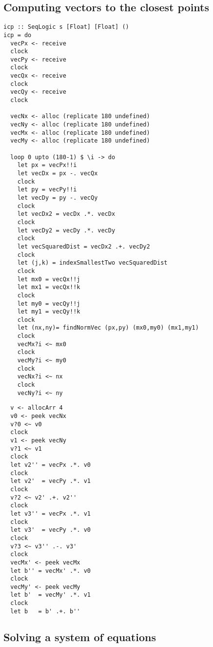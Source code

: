 \documentclass[preprint]{sigplanconf}
\def\codesmall{\sffamily\small}
\begin{document}
\subsection{Computing vectors to the closest points}

\lstset{basicstyle=\codesmall}

\begin{lstlisting}
icp :: SeqLogic s [Float] [Float] ()
icp = do
  vecPx <- receive
  clock
  vecPy <- receive
  clock
  vecQx <- receive
  clock
  vecQy <- receive
  clock

  vecNx <- alloc (replicate 180 undefined)
  vecNy <- alloc (replicate 180 undefined)
  vecMx <- alloc (replicate 180 undefined)
  vecMy <- alloc (replicate 180 undefined)

  loop 0 upto (180-1) $ \i -> do
    let px = vecPx!!i
    let vecDx = px -. vecQx
    clock
    let py = vecPy!!i
    let vecDy = py -. vecQy
    clock
    let vecDx2 = vecDx .*. vecDx
    clock
    let vecDy2 = vecDy .*. vecDy
    clock
    let vecSquaredDist = vecDx2 .+. vecDy2
    clock
    let (j,k) = indexSmallestTwo vecSquaredDist
    clock
    let mx0 = vecQx!!j
    let mx1 = vecQx!!k
    clock
    let my0 = vecQy!!j
    let my1 = vecQy!!k
    clock
    let (nx,ny)= findNormVec (px,py) (mx0,my0) (mx1,my1)
    clock
    vecMx?i <~ mx0
    clock
    vecMy?i <~ my0
    clock
    vecNx?i <~ nx
    clock
    vecNy?i <~ ny
\end{lstlisting}

\begin{lstlisting}
  v <- allocArr 4
  v0 <- peek vecNx
  v?0 <~ v0
  clock
  v1 <- peek vecNy
  v?1 <~ v1
  clock
  let v2'' = vecPx .*. v0
  clock
  let v2'  = vecPy .*. v1
  clock
  v?2 <~ v2' .+. v2''
  clock
  let v3'' = vecPx .*. v1
  clock
  let v3'  = vecPy .*. v0
  clock
  v?3 <~ v3'' .-. v3'
  clock
  vecMx' <- peek vecMx
  let b'' = vecMx' .*. v0
  clock
  vecMy' <- peek vecMy
  let b'  = vecMy' .*. v1
  clock
  let b   = b' .+. b''
\end{lstlisting}

\subsection{Solving a system of equations}
\end{document}
